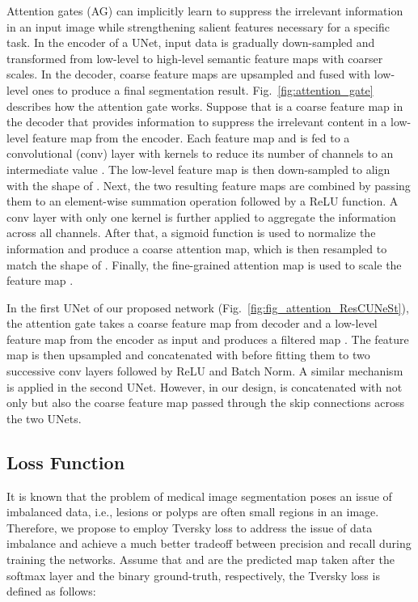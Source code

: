 \documentclass[review, sort&compress]{elsarticle}
\begin{document}
	Attention gates (AG) \cite{oktay2018attention} can implicitly learn to suppress the irrelevant information in an input image while strengthening salient features necessary for a specific task. In the encoder of a UNet, input data is gradually down-sampled and transformed from low-level to high-level semantic feature maps with coarser scales. In the decoder, coarse feature maps are upsampled and fused with low-level ones to produce a final segmentation result. Fig.~\ref{fig:attention_gate} describes how the attention gate works. Suppose that  is a coarse feature map in the decoder that provides information to suppress the irrelevant content in a low-level feature map  from the encoder. Each feature map  and  is fed to a  convolutional (conv) layer with  kernels to reduce its number of channels to an intermediate value . 
	The low-level feature map is then down-sampled to align with the shape of . Next, the two resulting feature maps are combined by passing them to an element-wise summation operation followed by a ReLU function. A  conv layer with only one kernel is further applied to aggregate the information across all channels. After that, a sigmoid function is used to normalize the information and produce a coarse attention map, which is then resampled to match the shape of . Finally, the fine-grained attention map  is used to scale the feature map .
	
	In the first UNet of our proposed network (Fig.~\ref{fig:fig_attention_ResCUNeSt}), the attention gate takes a coarse feature map  from decoder and a low-level feature map  from the encoder as input and produces a filtered map . The feature map  is then upsampled and concatenated with  before fitting them to two successive   conv layers followed by ReLU and Batch Norm. A similar mechanism is applied in the second UNet. However, in our design,  is concatenated with not only  but also the coarse feature map  passed through the skip connections across the two UNets.
	
	\subsection{Loss Function}
	It is known that the problem of medical image segmentation poses an issue of imbalanced data, i.e., lesions or polyps are often small regions in an image. Therefore, we propose to employ  Tversky loss \cite{salehi2017tversky} to address the issue of data imbalance and achieve a much better tradeoff between precision and recall during training the networks. Assume that  and  are the predicted map taken after the softmax layer and the binary ground-truth, respectively, the Tversky loss is defined as follows:
	
\end{document}
